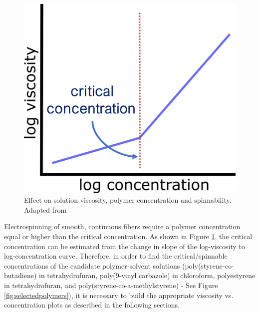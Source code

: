 \begin{figure}[!th]
\centering
\includegraphics[scale=0.45]{./Figures/concentrationViscosityPlotExplained.png}
\decoRule
\caption[Effect on Solution Viscosity and Related Electrospinning Capability]{Effect on solution viscosity, polymer concentration and spinnability. Adapted from \cite{Burghelea2020, Gupta2005, Han2019}}
\label{fig:concentrationViscosityPlotExplained}
\end{figure}

Electrospinning of smooth, continuous fibers require a polymer concentration equal or higher than the critical concentration. As shown in Figure \ref{fig:concentrationViscosityPlotExplained}, the critical concentration can be estimated from the change in slope of the log-viscosity to log-concentration curve. \cite{Burghelea2020, Gupta2005, Han2019} Therefore, in order to find the critical/spinnable concentrations of the candidate polymer-solvent solutions (poly(styrene-co-butadiene) in tetrahydrofuran, poly(9-vinyl carbazole) in chloroform, polyestyrene in tetrahydrofuran, and poly(styrene-co-a-methylstyrene) - See Figure \ref{fig:selectedpolymers}), it is necessary to build the appropriate viscosity vs. concentration plots as described in the following sections.

